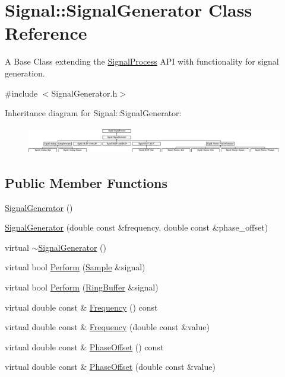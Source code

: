 \hypertarget{classSignal_1_1SignalGenerator}{\section{Signal\+:\+:Signal\+Generator Class Reference}
\label{classSignal_1_1SignalGenerator}
}


A Base Class extending the \hyperlink{classSignal_1_1SignalProcess}{Signal\+Process} A\+P\+I with functionality for signal generation.  




{\ttfamily \#include $<$Signal\+Generator.\+h$>$}

Inheritance diagram for Signal\+:\+:Signal\+Generator\+:\begin{figure}[H]
\begin{center}
\leavevmode
\includegraphics[height=1.196581cm]{classSignal_1_1SignalGenerator}
\end{center}
\end{figure}
\subsection*{Public Member Functions}
\begin{DoxyCompactItemize}
\item 
\hyperlink{classSignal_1_1SignalGenerator_a8c67c754d86e0363445d7fd271855e1a}{Signal\+Generator} ()
\item 
\hyperlink{classSignal_1_1SignalGenerator_a0a09e58b391b2e65af370bbf266b888c}{Signal\+Generator} (double const \&frequency, double const \&phase\+\_\+offset)
\item 
virtual \hyperlink{classSignal_1_1SignalGenerator_a2c0cb5fa941326bc206f45a07aa872ef}{$\sim$\+Signal\+Generator} ()
\item 
virtual bool \hyperlink{classSignal_1_1SignalGenerator_a2cd9061c5ae40a392a9476551b4379f3}{Perform} (\hyperlink{classSignal_1_1Sample}{Sample} \&signal)
\item 
virtual bool \hyperlink{classSignal_1_1SignalGenerator_a126d52dd9b6b14d33efc624e2c89284e}{Perform} (\hyperlink{classSignal_1_1RingBuffer}{Ring\+Buffer} \&signal)
\item 
virtual double const \& \hyperlink{classSignal_1_1SignalGenerator_a96af42ee68f94e9b04d034fd68b73ecd}{Frequency} () const 
\item 
virtual double const \& \hyperlink{classSignal_1_1SignalGenerator_af83b532bf3ddc3637c2fd7a1dfd095cb}{Frequency} (double const \&value)
\item 
virtual double const \& \hyperlink{classSignal_1_1SignalGenerator_ac2538ec946f001e394d2416fda698d1c}{Phase\+Offset} () const 
\item 
virtual double const \& \hyperlink{classSignal_1_1SignalGenerator_ac6a103ff72beaa338f6d18c812522d78}{Phase\+Offset} (double const \&value)
\end{DoxyCompactItemize}
